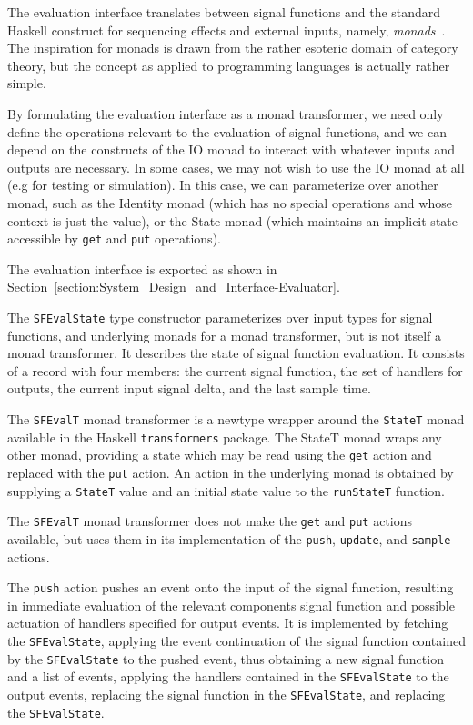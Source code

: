 The evaluation interface translates between signal functions and the standard
Haskell construct for sequencing effects and external inputs, namely,
{\em monads}~\cite{PeytonJones1993}. The inspiration for monads is drawn from
the rather esoteric domain of category theory, but the concept as applied to
programming languages is actually rather simple.

By formulating
the evaluation interface as a monad transformer, we need only define the
operations relevant to the evaluation of signal functions, and we can depend
on the constructs of the IO monad to interact with whatever inputs and outputs
are necessary. In some cases, we may not wish to use the IO monad at all (e.g
for testing or simulation). In this case, we can parameterize over another
monad, such as the Identity monad (which has no special operations and whose
context is just the value), or the State monad (which maintains an implicit 
state accessible by {\tt get} and {\tt put} operations).

The evaluation interface is exported as shown in
Section~\ref{section:System_Design_and_Interface-Evaluator}.

The {\tt SFEvalState} type constructor parameterizes over input types for signal
functions, and underlying monads for a monad transformer, but is not itself
a monad transformer. It describes the state of signal function evaluation.
It consists of a record with four members: the current signal function,
the set of handlers for outputs, the current input signal delta, and the last
sample time.

The {\tt SFEvalT} monad transformer is a newtype wrapper around the {\tt StateT}
monad available in the Haskell {\tt transformers} package. The StateT monad
wraps any other monad, providing a state which may be read using the {\tt get}
action and replaced with the {\tt put} action. An action in the underlying
monad is obtained by supplying a {\tt StateT} value and an initial state
value to the {\tt runStateT} function.

The {\tt SFEvalT} monad transformer does not make the {\tt get} and {\tt put}
actions available, but uses them in its implementation of the {\tt push},
{\tt update}, and {\tt sample} actions.

The {\tt push} action pushes an event onto the input of the signal function,
resulting in immediate evaluation of the relevant components signal function
and possible actuation of handlers specified for output events. It is
implemented by fetching the {\tt SFEvalState}, applying the event continuation
of the signal function contained by the {\tt SFEvalState} to the pushed event,
thus obtaining a new signal function and a list of events, applying the handlers
contained in the {\tt SFEvalState} to the output events, replacing the signal
function in the {\tt SFEvalState}, and replacing the {\tt SFEvalState}.

